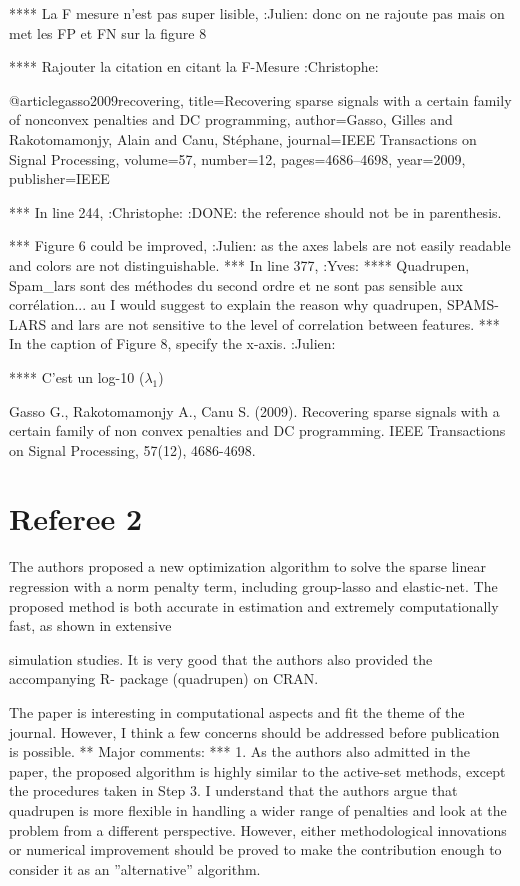 \documentclass[a4paper,11pt]{texMemo}
\begin{document}
**** La F mesure n'est pas super lisible, :Julien: 
donc on ne rajoute pas mais on met les FP et FN sur la figure 8

**** Rajouter la citation en citant la F-Mesure :Christophe:

@article{gasso2009recovering,
  title={Recovering sparse signals with a certain family of nonconvex penalties and DC programming},
  author={Gasso, Gilles and Rakotomamonjy, Alain and Canu, St{\'e}phane},
  journal={IEEE Transactions on Signal Processing},
  volume={57},
  number={12},
  pages={4686--4698},
  year={2009},
  publisher={IEEE}
}

*** In line 244, :Christophe: :DONE:
   the reference should not be in parenthesis.

*** Figure 6 could be improved, :Julien:
as the axes labels are not easily readable and colors are not
distinguishable.
*** In line 377,                                                       :Yves:
**** Quadrupen, Spam\_lars sont des méthodes du second ordre et ne sont pas sensible aux corrélation... au 
I would suggest to explain the reason why quadrupen, SPAMS-LARS and lars are not
sensitive to the level of correlation between features.
*** In the caption of Figure 8, specify the x-axis. :Julien: 

**** C'est un log-10 ($\lambda_1$)


Gasso G., Rakotomamonjy A., Canu S. (2009). Recovering sparse signals with a certain family of non convex penalties and DC programming. IEEE Transactions on Signal Processing, 57(12), 4686-4698.




\section*{Referee 2}
The authors proposed a new optimization algorithm to solve the sparse linear regression
with a norm penalty term, including group-lasso and elastic-net. The proposed method
is both accurate in estimation and extremely computationally fast, as shown in extensive

simulation studies. It is very good that the authors also provided the accompanying R-
package (quadrupen) on CRAN.

The paper is interesting in computational aspects and fit the theme of the journal.
However, I think a few concerns should be addressed before publication is possible.
** Major comments:
*** 1. As the authors also admitted in the paper, the proposed algorithm is highly similar
to the active-set methods, except the procedures taken in Step 3. I understand
that the authors argue that quadrupen is more flexible in handling a wider range
of penalties and look at the problem from a different perspective. However, either
methodological innovations or numerical improvement should be proved to make the
contribution enough to consider it as an ”alternative” algorithm.
\end{document}
